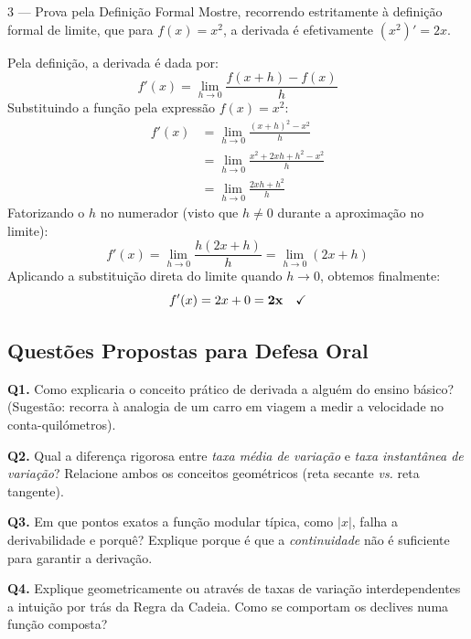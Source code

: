 \begin{exercisebox}{3 --- Prova pela Definição Formal}
  Mostre, recorrendo estritamente à definição formal de limite, que para $f(x) = x^2$, a derivada é efetivamente $(x^2)' = 2x$.
\end{exercisebox}
\begin{solbox}
  Pela definição, a derivada é dada por:
  \[
    f'(x) = \lim_{h\to 0} \frac{f(x+h)-f(x)}{h}
  \]
  Substituindo a função pela expressão $f(x) = x^2$:
  \begin{align*}
      f'(x) &= \lim_{h\to 0} \frac{(x+h)^2 - x^2}{h} \\
            &= \lim_{h\to 0} \frac{x^2 + 2xh + h^2 - x^2}{h} \\
            &= \lim_{h\to 0} \frac{2xh + h^2}{h}
  \end{align*}
  Fatorizando o $h$ no numerador (visto que $h \neq 0$ durante a aproximação no limite):
  \[
    f'(x) = \lim_{h\to 0} \frac{h(2x + h)}{h} = \lim_{h\to 0} (2x + h)
  \]
  Aplicando a substituição direta do limite quando $h \to 0$, obtemos finalmente:
  \[
    f'(x) = 2x + 0 = \mathbf{2x} \quad \text{\checkmark}
  \]
\end{solbox}

\subsection{Questões Propostas para Defesa Oral}

\begin{oralbox}
  \textbf{Q1.} Como explicaria o conceito prático de derivada a alguém do ensino básico? (Sugestão: recorra à analogia de um carro em viagem a medir a velocidade no conta-quilómetros).
\end{oralbox}

\begin{oralbox}
  \textbf{Q2.} Qual a diferença rigorosa entre \emph{taxa média de variação} e \emph{taxa instantânea de variação}? Relacione ambos os conceitos geométricos (reta secante \textit{vs.} reta tangente).
\end{oralbox}

\begin{oralbox}
  \textbf{Q3.} Em que pontos exatos a função modular típica, como $|x|$, falha a derivabilidade e porquê? Explique porque é que a \emph{continuidade} não é suficiente para garantir a derivação.
\end{oralbox}

\begin{oralbox}
  \textbf{Q4.} Explique geometricamente ou através de taxas de variação interdependentes a intuição por trás da Regra da Cadeia. Como se comportam os declives numa função composta?
\end{oralbox}